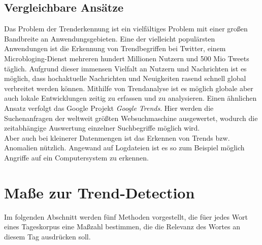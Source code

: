 \section{Vergleichbare Ansätze}
Das Problem der Trenderkennung ist ein vielfältiges Problem mit einer großen Bandbreite an Anwendungsgebieten. Eine der vielleicht populärsten Anwendungen ist die Erkennung von Trendbegriffen bei Twitter, einem Microbloging-Dienst mehreren hundert Millionen Nutzern und 500 Mio Tweets täglich. Aufgrund dieser immensen Vielfalt an Nutzern und Nachrichten ist es möglich, dass hochaktuelle Nachrichten und Neuigkeiten rasend schnell global verbreitet werden können. Mithilfe von Trendanalyse ist es möglich globale aber auch lokale Entwicklungen zeitig zu erfassen und zu analysieren.
Einen ähnlichen Ansatz verfolgt das Google Projekt \emph{Google Trends}. Hier werden die Suchenanfragen der weltweit größten Websuchmaschine ausgewertet, wodurch die zeitabhängige Auswertung einzelner Suchbegriffe möglich wird. \\
Aber auch bei kleinerer Datenmengen ist das Erkennen von Trends bzw. Anomalien nützlich. Angewand auf Logdateien ist es so zum Beispiel möglich Angriffe auf ein Computersystem zu erkennen. \cite{Zwietasch14}



\chapter{Maße zur Trend-Detection}
Im folgenden Abschnitt werden fünf Methoden vorgestellt, die f\"uer jedes Wort eines Tageskorpus eine Maßzahl bestimmen, die die Relevanz des Wortes an diesem Tag ausdrücken soll.






